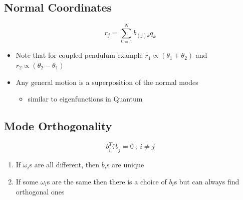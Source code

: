 \documentclass[a4paper,11pt,normalem]{article}
\begin{document}
\subsection{Normal Coordinates}\label{normal-coordinates}

\[
    r_j = \sum_{k = 1}^{N} b_{(j)k}q_{k}
\]

\begin{itemize}
\item
  Note that for coupled pendulum example
  \(r_1 \propto (\theta_1 + \theta_2)\) and
  \(r_2 \propto (\theta_2 - \theta_1)\)
\item
  Any general motion is a superposition of the normal modes

  \begin{itemize}

  \item
    similar to eigenfunctions in Quantum
  \end{itemize}
\end{itemize}

\subsection{Mode Orthogonality}\label{mode-orthogonality}

\[
    \underline{b}_{i}^{T} \hat{\tau} \underline{b}_j = 0 ~;~ i \neq j
\]

\begin{enumerate}
\item
  If \(\omega_{i}\)s are all different, then \(b_i\)s are unique
\item
  If some \(\omega_i\)s are the same then there is a choice of \(b_i\)s
  but can always find orthogonal ones
\end{enumerate}
\end{document}
